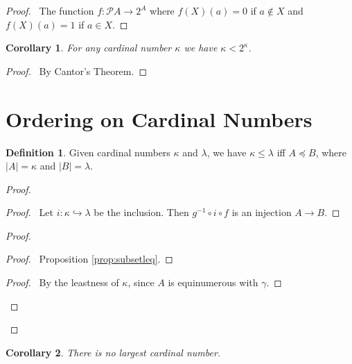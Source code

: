 \documentclass{book}
\let\qed\relax
\newtheorem{cor}{Corollary}[ax]
\theoremstyle{definition}
\newtheorem{df}[ax]{Definition}
\begin{document}
\begin{proof}
\pf\ The function $f : \mathcal{P} A \rightarrow 2^A$ where $f(X)(a) = 0$ if $a \notin X$ and $f(X)(a) = 1$ if $a \in X$. \qed
\end{proof}

\begin{cor}
For any cardinal number $\kappa$ we have $\kappa < 2^\kappa$.
\end{cor}

\begin{proof}
\pf\ By Cantor's Theorem. \qed
\end{proof}

\section{Ordering on Cardinal Numbers}

\begin{df}
Given cardinal numbers $\kappa$ and $\lambda$, we have $\kappa \leq \lambda$ iff $A \preccurlyeq B$, where $|A| = \kappa$ and $|B| = \lambda$.
\end{df}

\begin{proof}
\pf
{}
\begin{proof}
	\pf\ Let $i : \kappa \hookrightarrow \lambda$ be the inclusion. Then $g^{-1} \circ i \circ f$ is an injection $A \rightarrow B$.
\end{proof}
\begin{proof}
	\begin{proof}
		\pf\ Proposition \ref{prop:subsetleq}.
	\end{proof}
	\begin{proof}
		\pf\ By the leastness of $\kappa$, since $A$ is equinumerous with $\gamma$.
	\end{proof}
\end{proof}
\qed
\end{proof}

\begin{cor}
There is no largest cardinal number.
\end{cor}
\end{document}
